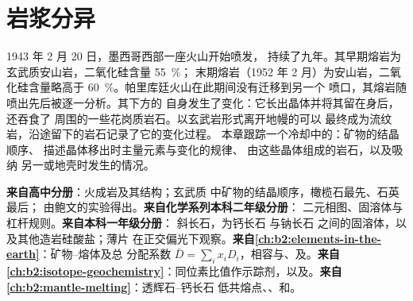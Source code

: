 \chapter{岩浆分异}\label{ch:b2:magmatic-differentiation}

1943 年 2 月 20 日，墨西哥西部一座火山开始喷发，
持续了九年。其早期熔岩为玄武质安山岩，二氧化硅含量 \qty{55}{\percent}；
末期熔岩（1952 年 2 月）为安山岩，二氧化硅含量略高于
\qty{60}{\percent}。帕里库廷火山在此期间没有迁移到另一个
喷口，其熔岩随喷出先后被逐一分析。其下方的
自身发生了变化：它长出晶体并将其留在身后，还吞食了
周围的一些花岗质岩石。以玄武岩形式离开地幔的可以
最终成为流纹岩，沿途留下的岩石记录了它的变化过程。
本章跟踪一个冷却中的：矿物的结晶顺序、
描述晶体移出时主量元素与变化的规律、
由这些晶体组成的岩石，以及吸纳
另一或地壳时发生的情况。

\begin{recall}
\textbf{来自高中分册}：火成岩及其结构；玄武质
中矿物的结晶顺序，橄榄石最先、石英最后；
由鲍文的实验得出。\textbf{来自化学系列本科二年级分册}：
二元相图、固溶体与杠杆规则。\textbf{来自本科一年级分册}：
斜长石，为钙长石  与钠长石
 之间的固溶体，以及其他造岩硅酸盐；薄片
在正交偏光下观察。\textbf{来自\cref{ch:b2:elements-in-the-earth}}：矿物–熔体及总
分配系数 $\bar D = \sum_i x_i D_i$，相容与、及。\textbf{来自
\cref{ch:b2:isotope-geochemistry}}：同位素比值作示踪剂，以及。\textbf{来自\cref{ch:b2:mantle-melting}}：透辉石–钙长石
低共熔点、、和。
\end{recall}

